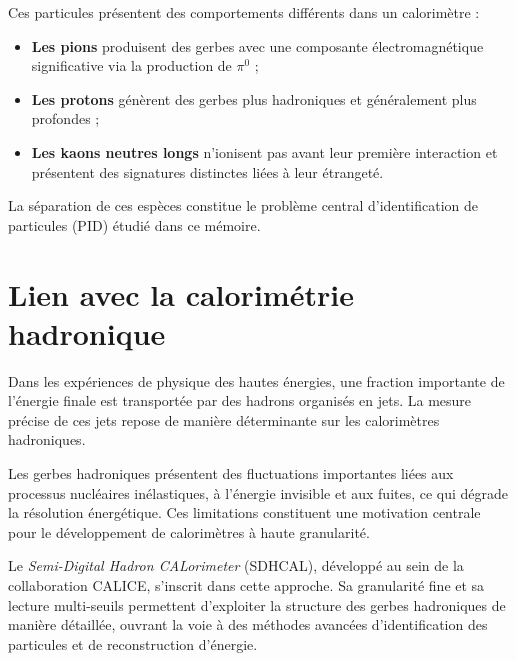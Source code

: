 Ces particules présentent des comportements différents dans un calorimètre :

\begin{itemize}
    \item \textbf{Les pions} produisent des gerbes avec une composante électromagnétique significative via la production de \(\pi^0\) ;
    \item \textbf{Les protons} génèrent des gerbes plus hadroniques et généralement plus profondes ;
    \item \textbf{Les kaons neutres longs} n'ionisent pas avant leur première interaction et présentent des signatures distinctes liées à leur étrangeté.
\end{itemize}

La séparation de ces espèces constitue le problème central d'identification de particules (PID) étudié dans ce mémoire.

\section{Lien avec la calorimétrie hadronique}

Dans les expériences de physique des hautes énergies, une fraction importante de l'énergie finale est transportée par des hadrons organisés en jets. La mesure précise de ces jets repose de manière déterminante sur les calorimètres hadroniques.

Les gerbes hadroniques présentent des fluctuations importantes liées aux processus nucléaires inélastiques, à l'énergie invisible et aux fuites, ce qui dégrade la résolution énergétique. Ces limitations constituent une motivation centrale pour le développement de calorimètres à haute granularité.

Le \emph{Semi-Digital Hadron CALorimeter} (SDHCAL), développé au sein de la collaboration CALICE, s'inscrit dans cette approche. Sa granularité fine et sa lecture multi-seuils permettent d'exploiter la structure des gerbes hadroniques de manière détaillée, ouvrant la voie à des méthodes avancées d'identification des particules et de reconstruction d'énergie.